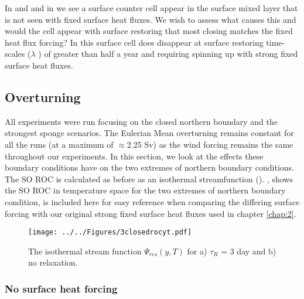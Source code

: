 In \citet{Zhai2014} and \citet{Abernathey2014} and in  we see a surface counter cell appear in the surface mixed layer that is not seen with fixed surface heat fluxes. We wish to assess what causes this and would the cell appear with surface restoring that most closing matches the fixed heat flux forcing? In \citet{Zhai2014} this surface cell does disappear at surface restoring time-scales ($\lambda $ ) of greater than half a year and requiring spinning up with strong fixed surface heat fluxes.

\subsection{Overturning}

All experiments were run focusing on the closed northern boundary and the strongest sponge scenarios. The Eulerian Mean overturning remains constant for all the runs (at a maximum of $\approx $2.25 Sv) as the wind forcing remains the same throughout our experiments. In this section, we look at the effects these boundary conditions have on the two extremes of northern boundary conditions. The SO ROC is calculated as before as an isothermal streamfunction (). , shows the SO ROC in temperature space for the two extremes of northern boundary condition, is included here for easy reference when comparing the differing surface forcing with our original strong fixed surface heat fluxes used in chapter \ref{chap:2}. 
\begin{figure}[H]
\noindent \texttt{[image: ../../Figures/3closedrocyt.pdf]}
\caption{The isothermal stream function $\Psi_{res}(y,T)$ for a) $\tau _R$ = 3 day and b) no relaxation.}
\label{fig:extremesyT}
\end{figure}

\subsubsection*{No surface heat forcing}

